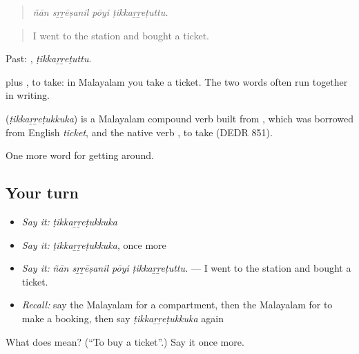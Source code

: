 \begin{quote}
\emph{ñān sṟṟēṣanil pōyi ṭikkaṟṟeṭuttu.}
\end{quote}

\begin{quote}
I went to the station and bought a ticket.
\end{quote}

Past: , \emph{ṭikkaṟṟeṭuttu}.

 plus , to take: in Malayalam you take a ticket. The two words often run together in writing.

\begin{cousinweb}
\textbf{} (\emph{ṭikkaṟṟeṭukkuka}) is a Malayalam compound verb built from , which was borrowed from English \emph{ticket}, and the native verb , to take (DEDR 851).
\end{cousinweb}

\begin{grammarlens}[title={What you've built}]
One more word for getting around.
\end{grammarlens}

\subsection*{Your turn}
\begin{itemize}
\raggedright
  \item \emph{Say it:} \emph{ṭikkaṟṟeṭukkuka}
  \item \emph{Say it:} \emph{ṭikkaṟṟeṭukkuka}, once more
  \item \emph{Say it:} \emph{ñān sṟṟēṣanil pōyi ṭikkaṟṟeṭuttu.} — I went to the station and bought a ticket.
  \item \emph{Recall:} say the Malayalam for a compartment, then the Malayalam for to make a booking, then say \emph{ṭikkaṟṟeṭukkuka} again
\end{itemize}

\begin{tcolorbox}[breakable,colback=teal!4,colframe=teal!35!black,title={Before you move on}]
What does  mean? (\textquotedblleft{}To buy a ticket\textquotedblright{}.) Say it once more.
\end{tcolorbox}
